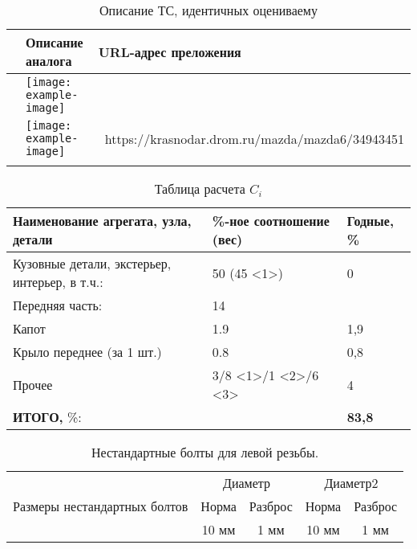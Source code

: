 \begin{longtable}{|p{5mm}|p{85mm}|p{60mm}|}
	\caption[]{\footnotesize {Описание ТС, идентичных оцениваему}} \label{tab:5}\\ 
	\hline
	\rowcolor[HTML]{C0C0C0} 
	\bf	\text{n/n} &\bf  Описание аналога & \bf URL-адрес преложения  \\ \hline \endhead
	\toprule \centering
	\Rownum  &\texttt{[image: example-image]} &\noindent {\scriptsize\ https://krasnodar.drom.ru/mazda/mazda6/34943451} \\ \hline 	\centering
	\Rownum  &\texttt{[image: example-image]} & {\noindent \centering  \scriptsize\ https://krasnodar.drom.ru/mazda/mazda6/34943451} \\ \hline 	\centering
	
\end{longtable}


\begin{longtable}{|p{9cm}|p{4cm}|p{2cm}|}
	\caption[]{\footnotesize {Таблица расчета $ C_i $ }}
	\label{tab:7}\\
	\hline
	Наименование агрегата, узла, детали & \%-ное соотношение (вес)  & Годные, \% \\
	\hline \endhead
	Кузовные детали, экстерьер, интерьер, в т.ч.: & 50 (45 \textless{}1\textgreater{}) & 0 \\
	Передняя часть: & 14 &  \\
	Капот & 1.9 & 1,9 \\
	Крыло переднее (за 1 шт.) & 0.8 & 0,8 \\

	Прочее & 3/8 \textless{}1\textgreater{}/1 \textless{}2\textgreater /6 \textless{}3\textgreater{} & 4 \\
	\hline
	\textbf{ИТОГО,} \%: &  & \textbf{83,8}  \\
	\hline	
\end{longtable}
\begin{table}[H]
	\caption{\label{tab:bolts} Нестандартные болты для левой резьбы.}
	\begin{center}
		\begin{tabular}{|c|c|c|c|c|}
			\hline
			\multirow{3}{*}{Размеры нестандартных болтов} & \multicolumn{2}{c|}{Диаметр} & \multicolumn{2}{c|}{Диаметр2} \\
			\cline{2-5}
			& Норма & Разброс & Норма & Разброс \\
			\cline{2-5}
			& 10 мм & 1 мм & 10 мм & 1 мм \\
			\hline
		\end{tabular}
	\end{center}
\end{table}

